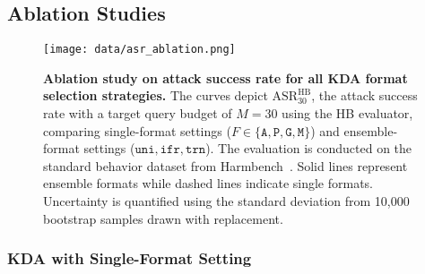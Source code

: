 

\subsection{Ablation Studies} 

\begin{figure}[h]
\centering
    \texttt{[image: data/asr\_ablation.png]}
    \vspace{-7mm}
    \caption{\textbf{Ablation study on attack success rate for all KDA format selection strategies.} The curves depict $\text{ASR}^{\text{HB}}_{30}$, the attack success rate with a target query budget of $M=30$ using the HB evaluator, comparing single-format settings ($F \in \{\texttt{A}, \texttt{P},\texttt{G}, \texttt{M}\}$) and ensemble-format settings ($ \texttt{uni}, \texttt{ifr}, \texttt{trn}$). The evaluation is conducted on the standard behavior dataset from Harmbench~\citep{mazeika_harmbench_2024}. Solid lines represent ensemble formats while dashed lines indicate single formats. Uncertainty is quantified using the standard deviation from 10,000 bootstrap samples drawn with replacement.
    }\label{fig:asr_ablation}
   \vspace{-3mm}
\end{figure}

\subsubsection{KDA with Single-Format Setting} 



